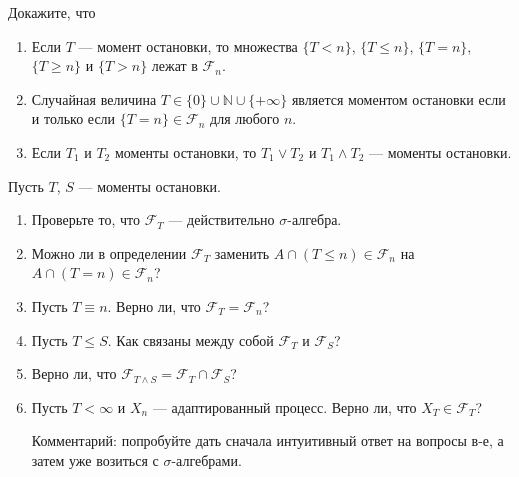 \begin{problem}
Докажите, что
\begin{enumerate}
\item  Если $T$ — момент остановки, то множества $\{T<n\}$, $\{T\le
n\}$, $\{T=n\}$, $\{T\ge n\}$ и $\{T>n\}$ лежат в
$\mathcal{F}_{n}$.
\item Случайная величина $T\in \{0\}\cup \mathbb{N}\cup \{+\infty\}$
является моментом остановки если и только если $\{T=n\}\in
\mathcal{F}_{n}$ для любого $n$.
\item Если $T_{1}$ и $T_{2}$ моменты остановки, то $T_{1}\vee T_{2}$
и $T_{1}\wedge T_{2}$ — моменты остановки.
\end{enumerate}

\begin{sol}

\end{sol}
\end{problem}

\begin{problem}
Пусть $T$, $S$ — моменты остановки.
\begin{enumerate}
\item Проверьте то, что $\mathcal{F}_{T}$ — действительно
$\sigma$-алгебра.
\item Можно ли в определении $\mathcal{F}_{T}$ заменить $A\cap (T\le
n)\in \mathcal{F}_{n}$ на $A\cap (T=n)\in
\mathcal{F}_{n}$?
\item Пусть $T\equiv n$. Верно ли, что
$\mathcal{F}_{T}=\mathcal{F}_{n}$?
\item Пусть $T\le S$. Как связаны между собой $\mathcal{F}_{T}$ и
$\mathcal{F}_{S}$?
\item Верно ли, что $\mathcal{F}_{T\wedge S}=\mathcal{F}_{T}\cap
\mathcal{F}_{S}$?
\item Пусть $T<\infty$ и $X_{n}$ — адаптированный процесс. Верно
ли, что $X_{T}\in \mathcal{F}_{T}$?

Комментарий: попробуйте дать сначала интуитивный ответ на вопросы
в-е, а затем уже возиться с $\sigma$-алгебрами.
\end{enumerate}

\begin{sol}

\end{sol}
\end{problem}

